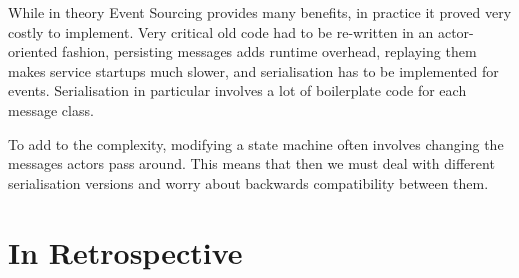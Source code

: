 \documentclass[conference]{IEEEtran}
\begin{document}
    While in theory Event Sourcing provides many benefits, in practice it proved very costly to
    implement.
    Very critical old code had to be re-written in an actor-oriented fashion, persisting messages
    adds runtime overhead, replaying them makes service startups much slower, and serialisation has
    to be implemented for events.
    Serialisation in particular involves a lot of boilerplate code for each message class.

    To add to the complexity, modifying a state machine often involves changing the messages actors
    pass around.
    This means that then we must deal with different serialisation versions and worry about
    backwards compatibility between them.


    \section{In Retrospective}

    \printbibliography
\end{document}
